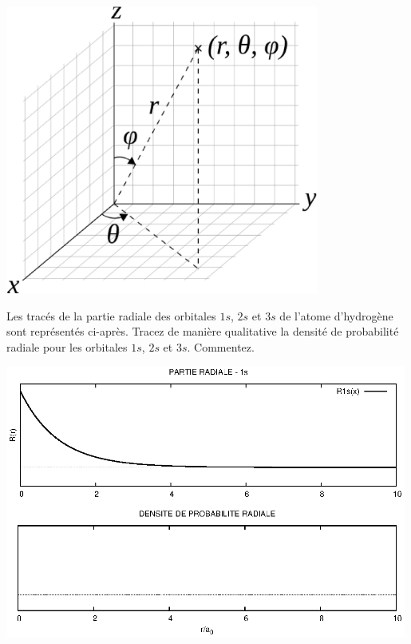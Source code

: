
\begin{center}
\includegraphics[height=9.5cm]{figure/spheriques.eps}\\
\end{center}


Les trac\'es de la partie radiale des orbitales $1s$, $2s$ et $3s$ de l'atome d'hydrog\`ene 
sont repr\'esent\'es ci-apr\`es.
Tracez de mani\`ere qualitative la densit\'e de probabilit\'e radiale pour les orbitales
$1s$, $2s$ et $3s$. Commentez. 

\begin{center}
\includegraphics[angle=90,width=0.99\textwidth]{figure/rad1s.eps}
\end{center}

